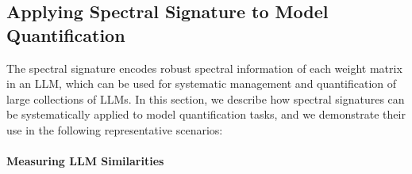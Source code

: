 
\subsection{Applying Spectral Signature to Model Quantification}\label{sec:applying_spectral_signature}
The spectral signature encodes robust spectral information of each weight matrix in an LLM, which can be used for systematic management and quantification of large collections of LLMs. In this section, we describe how spectral signatures can be systematically applied to model quantification tasks, and we demonstrate their use in the following representative scenarios:

\noindent\paragraph{Measuring LLM Similarities}\label{sec:method_llm_sim}






